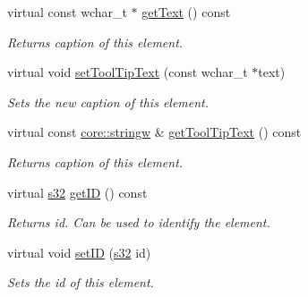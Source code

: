 \begin{DoxyCompactItemize}
virtual const wchar\+\_\+t $\ast$ \hyperlink{classirr_1_1gui_1_1IGUIElement_addaba768aba8a3e9d77b8ade88f05e13}{get\+Text} () const
\begin{DoxyCompactList}\small\item\em Returns caption of this element. \end{DoxyCompactList}\item 
\mbox{\label{classirr_1_1gui_1_1IGUIElement_a672f29f88c8d8f1e8ed1ac6c9f23b890}} 
virtual void \hyperlink{classirr_1_1gui_1_1IGUIElement_a672f29f88c8d8f1e8ed1ac6c9f23b890}{set\+Tool\+Tip\+Text} (const wchar\+\_\+t $\ast$text)
\begin{DoxyCompactList}\small\item\em Sets the new caption of this element. \end{DoxyCompactList}\item 
\mbox{\label{classirr_1_1gui_1_1IGUIElement_a9c19741dd210443b750e02ef7d639cf8}} 
virtual const \hyperlink{namespaceirr_1_1core_aef83fafbb1b36fcce44c07c9be23a7f2}{core\+::stringw} \& \hyperlink{classirr_1_1gui_1_1IGUIElement_a9c19741dd210443b750e02ef7d639cf8}{get\+Tool\+Tip\+Text} () const
\begin{DoxyCompactList}\small\item\em Returns caption of this element. \end{DoxyCompactList}\item 
\mbox{\label{classirr_1_1gui_1_1IGUIElement_af838c5de4a09e09a89de74d67d07d80c}} 
virtual \hyperlink{namespaceirr_ac66849b7a6ed16e30ebede579f9b47c6}{s32} \hyperlink{classirr_1_1gui_1_1IGUIElement_af838c5de4a09e09a89de74d67d07d80c}{get\+ID} () const
\begin{DoxyCompactList}\small\item\em Returns id. Can be used to identify the element. \end{DoxyCompactList}\item 
\mbox{\label{classirr_1_1gui_1_1IGUIElement_a55bad0e14306765e1fb734c56b729ba4}} 
virtual void \hyperlink{classirr_1_1gui_1_1IGUIElement_a55bad0e14306765e1fb734c56b729ba4}{set\+ID} (\hyperlink{namespaceirr_ac66849b7a6ed16e30ebede579f9b47c6}{s32} id)
\begin{DoxyCompactList}\small\item\em Sets the id of this element. \end{DoxyCompactList}\item 

\end{DoxyCompactItemize}
